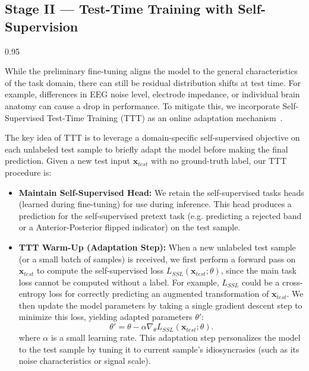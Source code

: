 \documentclass{article} %
\begin{document}
\subsection{Stage II — Test-Time Training with Self-Supervision}
\begin{spacing}{0.95}

While the preliminary fine-tuning aligns the model to the general characteristics of the task domain, there can still be residual distribution shifts at test time. For example, differences in EEG noise level, electrode impedance, or individual brain anatomy can cause a drop in performance. To mitigate this, we incorporate Self-Supervised Test-Time Training (TTT) as an online adaptation mechanism~\citep{xiao2024beyond}.

The key idea of TTT is to leverage a domain-specific self-supervised objective on each unlabeled test sample to briefly adapt the model before making the final prediction. Given a new test input $\mathbf{x}_{test}$ with no ground-truth label, our TTT procedure is:

\begin{itemize}

    \item \textbf{Maintain Self-Supervised Head:} We retain the self-supervised tasks heads (learned during fine-tuning) for use during inference. This head produces a prediction for the self-supervised pretext task (e.g. predicting a rejected band or a Anterior-Posterior flipped indicator) on the test sample.
    
    \item \textbf{TTT Warm-Up (Adaptation Step):} When a new unlabeled test sample (or a small batch of samples) is received, we first perform a forward pass on $\mathbf{x}_{test}$ to compute the self-supervised loss $L_{SSL}(\mathbf{x}_{test}; \theta)$, since the main task loss cannot be computed without a label. For example, $L_{SSL}$ could be a cross-entropy loss for correctly predicting an augmented transformation of $\mathbf{x}_{test}$. We then update the model parameters by taking a single gradient descent step to minimize this loss, yielding adapted parameters $\theta'$:
    \begin{equation}
        \theta' = \theta - \alpha \nabla_{\theta} L_{SSL}(\mathbf{x}_{test}; \theta).
    \end{equation}
    where $\alpha$ is a small learning rate. This adaptation step personalizes the model to the test sample by tuning it to current sample’s idiosyncrasies (such as its noise characteristics or signal scale).
    

\end{itemize}
\end{spacing}
\end{document}
